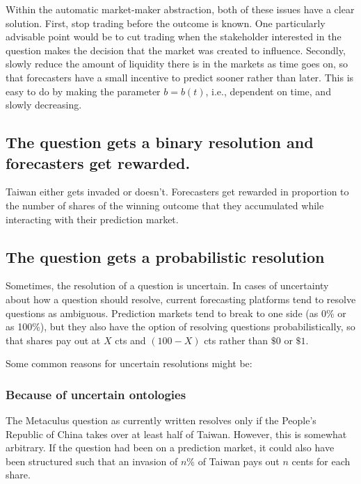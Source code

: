 \documentclass[]{article}
\begin{document}
Within the automatic market-maker abstraction, both of these issues have
a clear solution. First, stop trading before the outcome is known. One
particularly advisable point would be to cut trading when the
stakeholder interested in the question makes the decision that the
market was created to influence. Secondly, slowly reduce the amount of
liquidity there is in the markets as time goes on, so that forecasters
have a small incentive to predict sooner rather than later. This is easy
to do by making the parameter \(b=b(t)\), i.e., dependent on time, and
slowly decreasing.

\hypertarget{the-question-gets-a-binary-resolution-and-forecasters-get-rewarded.}{%
\subsection{The question gets a binary resolution and forecasters get
rewarded.}\label{the-question-gets-a-binary-resolution-and-forecasters-get-rewarded.}}

Taiwan either gets invaded or doesn't. Forecasters get rewarded in
proportion to the number of shares of the winning outcome that they
accumulated while interacting with their prediction market.

\hypertarget{the-question-gets-a-probabilistic-resolution}{%
\subsection{The question gets a probabilistic
resolution}\label{the-question-gets-a-probabilistic-resolution}}

Sometimes, the resolution of a question is uncertain. In cases of
uncertainty about how a question should resolve, current forecasting
platforms tend to resolve questions as ambiguous. Prediction markets
tend to break to one side (as 0\% or as 100\%), but they also have the
option of resolving questions probabilistically, so that shares pay out
at \(X\) cts and \((100-X)\) cts rather than \(\$0\) or \(\$1\).

Some common reasons for uncertain resolutions might be:

\hypertarget{because-of-uncertain-ontologies}{%
\subsubsection{Because of uncertain
ontologies}\label{because-of-uncertain-ontologies}}

The Metaculus question as currently written resolves only if the
People's Republic of China takes over at least half of Taiwan. However,
this is somewhat arbitrary. If the question had been on a prediction
market, it could also have been structured such that an invasion of
\(n\)\% of Taiwan pays out \(n\) cents for each share.
\end{document}
